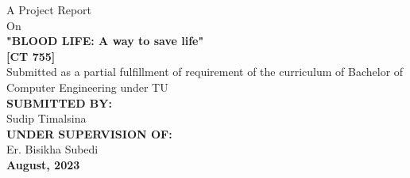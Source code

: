 
{
    \thispagestyle{empty}
    \centering

   \fontsize{14pt}{14pt}\selectfont
        {A Project Report}\\ 
        {On}\\[1.5cm]

        
            \textbf{"\MakeUppercase{blood life}: A way to save life"}\\
            \textbf{[CT 755]}\\[2cm]
    {Submitted as a partial fulfillment of requirement of the curriculum of Bachelor of Computer Engineering under TU}\\[3cm]
    \textbf{\MakeUppercase{Submitted By:}}\\
    {Sudip Timalsina}\\[2.5cm]
    
    \textbf{\MakeUppercase{Under Supervision Of:}}\\
    {Er. Bisikha Subedi}\\[2.5cm]
    
        \textbf{August, 2023}\\
}
